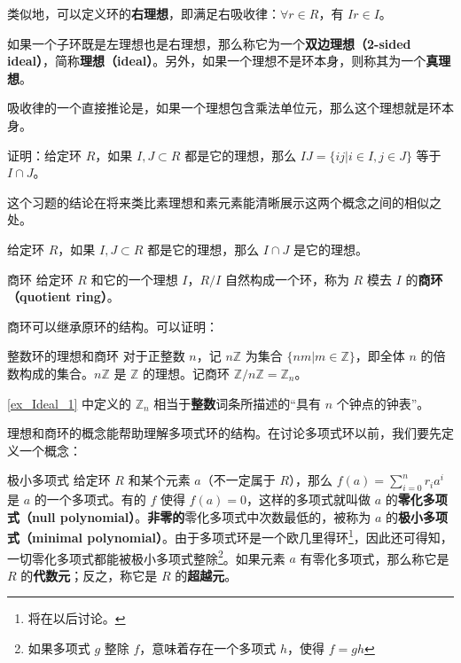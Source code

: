 类似地，可以定义环的\textbf{右理想}，即满足右吸收律：$\forall r\in R$，有 $Ir\in I$。

如果一个子环既是左理想也是右理想，那么称它为一个\textbf{双边理想（2-sided ideal）}，简称\textbf{理想（ideal）}。另外，如果一个理想不是环本身，则称其为一个\textbf{真理想}。

吸收律的一个直接推论是，如果一个理想包含乘法单位元，那么这个理想就是环本身。

\begin{exercise}{}
证明：给定环 $R$，如果 $I, J\subset R$ 都是它的理想，那么 $IJ=\{ij|i\in I, j\in J\}$ 等于 $I\cap J$。
\end{exercise}

这个习题的结论在将来类比素理想和素元素能清晰展示这两个概念之间的相似之处。

\begin{theorem}{}
给定环 $R$，如果 $I, J\subset R$ 都是它的理想，那么 $I\cap J$ 是它的理想。
\end{theorem}


\begin{definition}{商环}
给定环 $R$ 和它的一个理想 $I$，$R/I$ 自然构成一个环，称为 $R$ 模去 $I$ 的\textbf{商环（quotient ring）}。
\end{definition}
商环可以继承原环的结构。可以证明：


\begin{example}{整数环的理想和商环}\label{ex_Ideal_1}
对于正整数 $n$，记 $n\mathbb{Z}$ 为集合 $\{nm|m\in\mathbb{Z}\}$，即全体 $n$ 的倍数构成的集合。$n\mathbb{Z}$ 是 $\mathbb{Z}$ 的理想。记商环 $\mathbb{Z}/n\mathbb{Z}=\mathbb{Z}_n$。
\end{example}

\autoref{ex_Ideal_1} 中定义的 $\mathbb{Z}_n$ 相当于\textbf{整数}词条所描述的“具有 $n$ 个钟点的钟表”。


理想和商环的概念能帮助理解多项式环的结构。在讨论多项式环以前，我们要先定义一个概念：

\begin{definition}{极小多项式}
给定环 $R$ 和某个元素 $a$（不一定属于 $R$），那么 $f(a)=\sum\limits^{n}_{i=0}r_ia^i$ 是 $a$ 的一个多项式。有的 $f$ 使得 $f(a)=0$，这样的多项式就叫做 $a$ 的\textbf{零化多项式（null polynomial）}。\textbf{非零的}零化多项式中次数最低的，被称为 $a$ 的\textbf{极小多项式（minimal polynomial）}。由于多项式环是一个欧几里得环\footnote{将在以后讨论。}，因此还可得知，一切零化多项式都能被极小多项式整除\footnote{如果多项式 $g$ 整除 $f$，意味着存在一个多项式 $h$，使得 $f=gh$}。如果元素 $a$ 有零化多项式，那么称它是 $R$ 的\textbf{代数元}；反之，称它是 $R$ 的\textbf{超越元}。
\end{definition}

